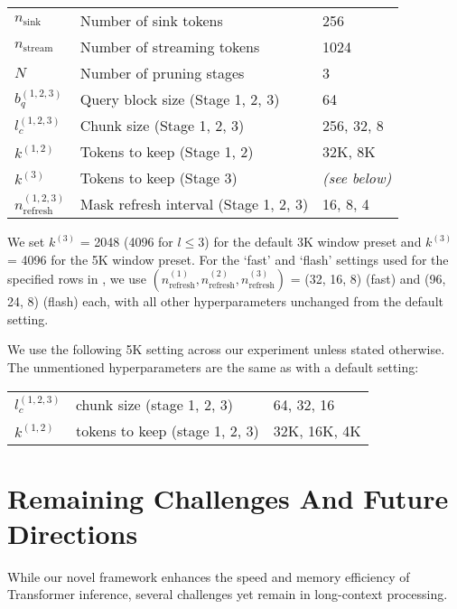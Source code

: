 \hspace{1.0in}
\begin{tabular}{p{1in} p{2.5in} p{1in}}
$n_\text{sink}$ & Number of sink tokens & 256 \\
$n_\text{stream}$ & Number of streaming tokens & 1024 \\
$N$ & Number of pruning stages & 3 \\
$b_q^{(1, 2, 3)}$ & Query block size (Stage 1, 2, 3) & 64 \\
$l_c^{(1, 2, 3)}$ & Chunk size (Stage 1, 2, 3) & 256, 32, 8 \\
$k^{(1, 2)}$ & Tokens to keep (Stage 1, 2) & 32K, 8K \\
$k^{(3)}$ & Tokens to keep (Stage 3) & {\textit{(see below)}} \\
$n_\text{refresh}^{(1, 2, 3)}$ & Mask refresh interval (Stage 1, 2, 3) & 16, 8, 4 \\
\end{tabular}

We set $k^{(3)}$ = 2048 (4096 for $l\leq 3$) for the default 3K window preset and $k^{(3)}$ = 4096 for the 5K window preset.
For the `fast' and `flash' settings used for the specified rows in , we use $(n_\text{refresh}^{(1)}, n_\text{refresh}^{(2)}, n_\text{refresh}^{(3)})$ = (32, 16, 8) (fast) and (96, 24, 8) (flash) each, with all other hyperparameters unchanged from the default setting.

We use the following 5K setting across our experiment unless stated otherwise. The unmentioned hyperparameters are the same as with a default setting:

\hspace{1.0in}
\begin{tabular}{p{1in} p{2.5in} p{1in}}
$l_c^{(1, 2, 3)}$ & chunk size (stage 1, 2, 3) & 64, 32, 16 \\
$k^{(1, 2)}$ & tokens to keep (stage 1, 2, 3) & 32K, 16K, 4K \\
\end{tabular}

\newpage
\section{Remaining Challenges And Future Directions}

While our novel framework enhances the speed and memory efficiency of Transformer inference, several challenges yet remain in long-context processing. 

